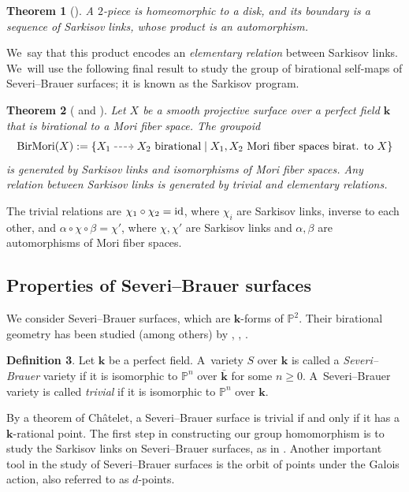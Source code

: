 \documentclass[JEP,XML,SOM,Unicode,NoFloatCountersInSection, NoEqCountersInSection,published]{cedram}
\newcommand{\dradpl}{{\hspace*{-2mm}\begin{tikzcd}[ampersand replacement=\&,column sep = scriptsize]\mbox{}\ar[r,dashed]\&\mbox{}\end{tikzcd}\hspace*{-2mm}}}
\newcommand{\dratst}{{\hspace*{-2.5mm}\begin{tikzcd}[ampersand replacement=\&,column sep = small]\mbox{}\ar[r,dashed]\&\mbox{}\end{tikzcd}\hspace*{-2mm}}}
\let\drascst\dratst
\newcommand{\dra}{\mathchoice{\dradpl}{\dratst}{\drascst}{\drascst}}
\newcommand{\id}{\textup{id}}
\newtheorem{theorem}{Theorem}[section]
\theoremstyle{definition}
\newtheorem{definition}[theorem]{Definition}
\newcommand{\kk}{{\boldsymbol{k}}}
\DeclareMathOperator{\BirMori}{BirMori}
\begin{document}
\begin{theorem}[{\cite[Prop.\,2.6]{Lamy_2020}}]\label{ElementaryRelation}
A $2$-piece is homeomorphic to a disk, and its boundary is a sequence of Sarkisov links, whose product is an automorphism.
\end{theorem}

We~say that this product encodes an \emph{elementary relation} between Sarkisov links. We~will use the following final result to study the group of birational self-maps of Severi--Brauer surfaces; it is known as the Sarkisov program.

\begin{theorem}[{\cite{Iskovskikh} and \cite[Th.\,3.1]{Lamy_2020}}] \label{Isk}
Let $X$ be a smooth projective surface over a perfect field $\kk$ that is birational to a Mori fiber space. The groupoid
\[
\BirMori(X) := \{X_1 \dra X_2 \text{ birational} \mid X_1,X_2 \text{ Mori fiber spaces birat. to } X\}
\]
is generated by Sarkisov links and isomorphisms of Mori fiber spaces. Any relation between Sarkisov links is generated by trivial and elementary relations.
\end{theorem}

The trivial relations are $\chi_1 \circ \chi_2 = \id$, where $\chi_i$ are Sarkisov links, inverse to each other, and $\alpha \circ \chi \circ \beta = \chi'$, where $\chi, \chi'$ are Sarkisov links and $\alpha, \beta $ are automorphisms of Mori fiber spaces.
\subsection{Properties of Severi--Brauer surfaces}
We consider Severi--Brauer surfaces, which are $\kk$-forms of $\mathbb{P}^2$. Their birational geometry has been studied (among others) by \cite{BSY}, \cite{zbMATH07206468}, \cite{cm:9040}.

\begin{definition}
Let $\kk$ be a perfect field. A~variety $S$ over $\kk$ is called a \emph{Severi--Brauer} variety if it is isomorphic to $\mathbb{P}^n$ over $\bar{\kk}$ for some $n \geq 0$. A~Severi--Brauer variety is called \emph{trivial} if it is isomorphic to $\mathbb{P}^n$ over $\kk$.
\end{definition}
By a theorem of Châtelet, a Severi--Brauer surface is trivial if and only if it has a $\kk$-rational point.
The first step in constructing our group homomorphism is to study the Sarkisov links on Severi--Brauer surfaces, as in \cite{BSY}. Another important tool in the study of Severi--Brauer surfaces is the orbit of points under the Galois action, also referred to as $d$-points.
\end{document}
